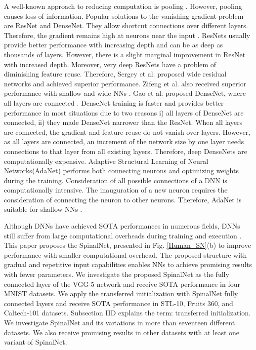 \documentclass[journal]{IEEEtran}
\begin{document}
A well-known approach to reducing computation is pooling \cite{lawrence1997face}. However, pooling causes loss of information. 
Popular solutions to the vanishing gradient problem are ResNet and DenseNet. They allow shortcut connections over different layers. Therefore, the gradient remains high at neurons near the input \cite{he2016deep}. ResNets usually provide better performance with increasing depth and can be as deep as thousands of layers. However, there is a slight marginal improvement in ResNet with increased depth. Moreover, very deep ResNets have a problem of diminishing feature reuse. Therefore, Sergey et al. proposed wide residual networks \cite{zagoruyko2016wide } and achieved superior performance.  Zifeng et al. also received superior performance with shallow and wide NNs \cite{wu2019wider}. Gao et al. proposed DenseNet, where all layers are connected \cite{huang2017densely}. DenseNet training is faster and provides better performance in most situations due to two reasons i) all layers of DenseNet are connected, ii) they made DenseNet narrower than the ResNet. When all layers are connected, the gradient and feature-reuse do not vanish over layers.  However, as all layers are connected, an increment of the network size by one layer needs connections to that layer from all existing layers. Therefore, deep DenseNets are computationally expensive. Adaptive Structural Learning of Neural Networks(AdaNet) performs both connecting neurons and optimizing weights during the training. Consideration of all possible connections of a DNN is computationally intensive. The inauguration of a new neuron requires the consideration of connecting the neuron to other neurons. Therefore, AdaNet is suitable for shallow NNs \cite{cortes2017adanet, kabir2019partial}. 


Although DNNs have achieved SOTA performances in numerous fields, DNNs still suffer from large computational overheads during training and execution \cite{jalali2019optimal}. This paper proposes the SpinalNet, presented in Fig. \ref{Human_SN}(b) to improve performance with smaller computational overhead. The proposed structure with gradual and repetitive input capabilities enables NNs to achieve promising results with fewer parameters. We investigate the proposed SpinalNet as the fully connected layer of the VGG-5 network and receive SOTA performance in four MNIST datasets. We apply the transferred initialization with SpinalNet fully connected layers and receive SOTA performance in STL-10, Fruits 360, and Caltech-101 datasets. Subsection IID explains the term: transferred initialization. We investigate SpinalNet and its variations in more than seventeen different datasets. We also receive promising results in other datasets with at least one variant of SpinalNet.
\end{document}
